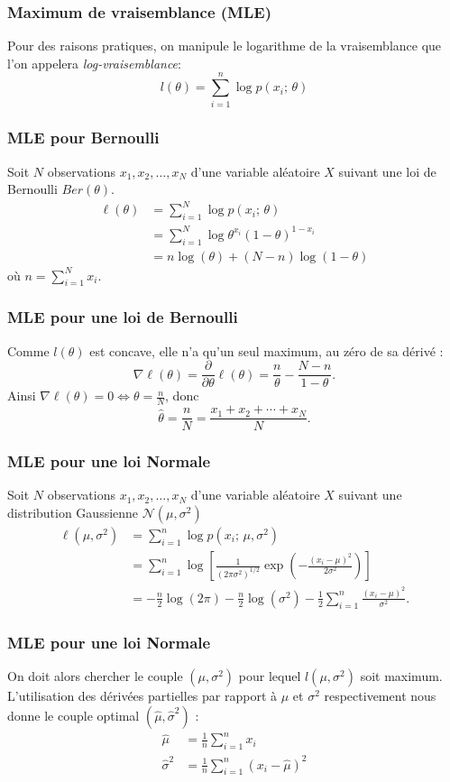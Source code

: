\begin{frame}
  \frametitle{Maximum de vraisemblance (MLE)}
  Pour des raisons pratiques, on manipule le logarithme de la vraisemblance que l'on appelera \textit{log-vraisemblance}:
  \[
      l(\theta) = \sum_{i=1}^n \log p(x_i; \, \theta)
  \]
\end{frame}

\begin{frame}
  \frametitle{MLE pour Bernoulli}
Soit $N$ observations $x_1,x_2,\ldots,x_N$ d'une variable aléatoire $X$ suivant une loi de Bernoulli $Ber(\theta)$.
\begin{align*}
\ell(\theta) 	&= \sum_{i=1}^N \log p(x_i; \, \theta) \\
				&= \sum_{i=1}^N \log \theta^{x_i}(1-\theta)^{1-x_i}\\
				&= n\log(\theta)+(N-n)\log(1-\theta)
\end{align*} 
où $n=\sum_{i=1}^N x_i$.\\ 
\end{frame}

\begin{frame}
  \frametitle{MLE pour une loi de Bernoulli}
Comme $l(\theta)$ est concave, elle n'a qu'un seul maximum, au zéro de sa dérivé :
$$\nabla \ell(\theta)=\frac{\partial}{\partial\theta} \ell(\theta) = \frac{n}{\theta}-\frac{N-n}{1-\theta}.$$  
Ainsi $\nabla \ell(\theta) = 0 \Longleftrightarrow \theta =\frac{n}{N}$, donc
$$\hat{\theta} = \frac{n}{N} = \frac{x_1+x_2+\cdots+x_N}{N}.$$
\end{frame}

\begin{frame}
  \frametitle{MLE pour une loi Normale}
  Soit $N$ observations $x_1,x_2,\ldots,x_N$ d'une variable aléatoire $X$ suivant une distribution Gaussienne $\mathcal{N}(\mu,\sigma^2)$
\begin{align*}
\ell(\mu,\sigma^2) 	&= \sum_{i=1}^n \log p(x_i; \, \mu,\sigma^2) \\
				&= \sum_{i=1}^n \log\left[ \frac{1}{(2\pi\sigma^2)^{1/2}}\exp\left(-\frac{(x_i-\mu)^2}{2\sigma^2}\right)\right]\\
				&= -\frac{n}{2}\log(2\pi)-\frac{n}{2}\log(\sigma^2)-\frac{1}{2}\sum_{i=1}^n \frac{(x_i-\mu)^2}{\sigma^2}.				
\end{align*} 
\end{frame}

\begin{frame}
  \frametitle{MLE pour une loi Normale}
  On doit alors chercher le couple $(\mu, \sigma^2)$ pour lequel $l(\mu,\sigma^2)$ soit maximum. L'utilisation des dérivées partielles par rapport à $\mu$ et $\sigma^2$ respectivement nous donne le couple optimal $(\hat{\mu},\hat{\sigma}^2)$ :
\begin{align*}
\hat{\mu}&=\frac{1}{n}\sum_{i=1}^n x_i \\
\hat{\sigma}^2&=\frac{1}{n}\sum_{i=1}^n \left(x_i-\hat{\mu}\right)^2
\end{align*}
\end{frame}
